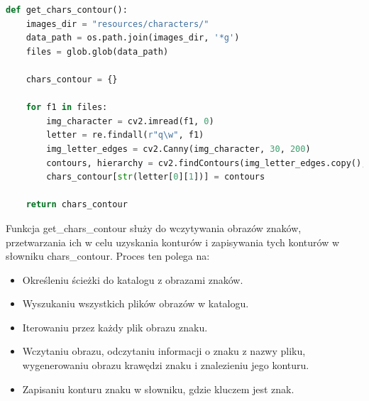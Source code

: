 \documentclass[12pt,a4paper,oneside]{article}
\theoremstyle{definition}
\numberwithin{equation}{section}
\begin{document}
\begin{lstlisting}[language=Python]
def get_chars_contour():
    images_dir = "resources/characters/"
    data_path = os.path.join(images_dir, '*g')
    files = glob.glob(data_path)

    chars_contour = {}

    for f1 in files:
        img_character = cv2.imread(f1, 0)
        letter = re.findall(r"q\w", f1)
        img_letter_edges = cv2.Canny(img_character, 30, 200)
        contours, hierarchy = cv2.findContours(img_letter_edges.copy(), cv2.RETR_EXTERNAL, cv2.CHAIN_APPROX_NONE)
        chars_contour[str(letter[0][1])] = contours

    return chars_contour
\end{lstlisting} 

Funkcja get{\_}chars{\_}contour służy do wczytywania obrazów znaków, przetwarzania ich w celu uzyskania konturów i zapisywania tych konturów w słowniku chars{\_}contour. Proces ten polega na:



\begin{itemize}
  \item Określeniu ścieżki do katalogu z obrazami znaków.
  \item Wyszukaniu wszystkich plików obrazów w katalogu.
  \item Iterowaniu przez każdy plik obrazu znaku.
  \item Wczytaniu obrazu, odczytaniu informacji o znaku z nazwy pliku, wygenerowaniu obrazu krawędzi znaku i znalezieniu jego konturu.
  \item Zapisaniu konturu znaku w słowniku, gdzie kluczem jest znak.
\end{itemize}
\end{document}

